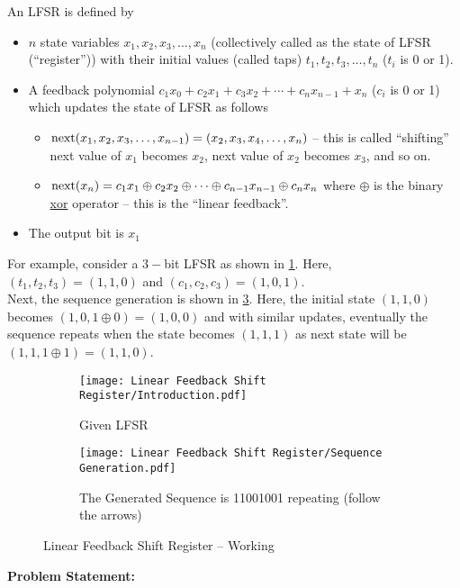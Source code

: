 An LFSR is defined by
\begin{itemize}	
	\item $n$ state variables $x_1, x_2, x_3,\ldots, x_n$ (collectively called as the state of LFSR (``register'')) with their initial values (called taps) $t_1, t_2, t_3,\ldots, t_n$ ($t_i$ is 0 or 1).
	\item A feedback polynomial $c_1x_0 + c_2x_1 + c_3x_2 + \cdots +  c_nx_{n-1} + x_n$ ($c_i$ is 0 or 1) which updates the state of LFSR as follows
	\begin{itemize}
		\item $\operatorname{next}(x_1, x_2, x_3,\ldots, x_{n-1}) = (x_2, x_3, x_4,\ldots, x_n)$ -- this is called ``shifting'' next value of $x_1$ becomes $x_2$, next value of $x_2$ becomes $x_3$, and so on.
		\item $\operatorname{next}(x_n) =  c_1x_1 \oplus c_2x_2 \oplus \cdots \oplus c_{n-1}x_{n-1}\oplus c_nx_n$ where $\oplus$ is the binary \href{https://en.wikipedia.org/wiki/Exclusive_or}{xor} operator -- this is the ``linear feedback''.
	\end{itemize}
	\item The output bit is $x_1$
\end{itemize}
For example, consider a $3-$bit LFSR as shown in \ref{fig:lfsrintro}. Here, $(t_1,t_2,t_3)=(1,1,0)$ and $(c_1,c_2,c_3)=(1,0,1)$.\\
Next, the sequence generation is shown in \ref{fig:lfsrgeneration}. Here, the initial state $(1,1,0)$ becomes $(1,0,1\oplus0) = (1,0,0)$ and with similar updates, eventually the sequence repeats when the state becomes $(1,1,1)$ as next state will be $(1,1,1\oplus1) = (1,1,0)$.
\begin{figure}[H]
	\centering
	\begin{subfigure}[c]{0.4\linewidth}
		\centering
		\texttt{[image: Linear Feedback Shift Register/Introduction.pdf]}
		\caption{Given LFSR}
		\label{fig:lfsrintro}
	\end{subfigure}
	\begin{subfigure}[c]{0.45\linewidth}
		\centering
		\texttt{[image: Linear Feedback Shift Register/Sequence Generation.pdf]}
		\caption{The Generated Sequence is 11001001 repeating (follow the arrows)}
		\label{fig:lfsrgeneration}
	\end{subfigure}
	\caption{Linear Feedback Shift Register -- Working}
\end{figure}
\vspace{-2em}
\textbf{Problem Statement:}\\
